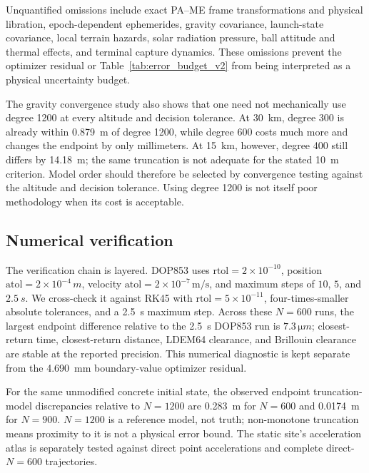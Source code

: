 Unquantified omissions include exact PA--ME frame transformations and physical libration, epoch-dependent ephemerides, gravity covariance, launch-state covariance, local terrain hazards, solar radiation pressure, ball attitude and thermal effects, and terminal capture dynamics. These omissions prevent the optimizer residual or Table~\ref{tab:error_budget_v2} from being interpreted as a physical uncertainty budget.

The gravity convergence study also shows that one need not mechanically use
degree 1200 at every altitude and decision tolerance. At \SI{30}{km}, degree 300 is already within
\SI{0.879}{m} of degree 1200, while degree 600 costs much more and changes the
endpoint by only millimeters. At \SI{15}{km}, however, degree 400 still differs
by \SI{14.18}{m}; the same truncation is not adequate for the stated
\SI{10}{m} criterion. Model order should therefore be selected by convergence
testing against the altitude and decision tolerance. Using degree 1200 is not
itself poor methodology when its cost is acceptable.

\subsection{Numerical verification}

The verification chain is layered. DOP853 uses
\(\mathrm{rtol}=2\times10^{-10}\), position
\(\mathrm{atol}=2\times10^{-4}\,\si{m}\), velocity
\(\mathrm{atol}=2\times10^{-7}\,\si{\metre\per\second}\), and maximum steps of
\(10\), \(5\), and \(\SI{2.5}{s}\). We cross-check it against RK45 with
\(\mathrm{rtol}=5\times10^{-11}\), four-times-smaller absolute tolerances,
and a \SI{2.5}{s} maximum step. Across these \(N=600\) runs, the largest
endpoint difference relative to the \SI{2.5}{s} DOP853 run is
\(7.3\,\si{\micro m}\); closest-return time, closest-return distance,
LDEM64 clearance, and Brillouin clearance are stable at the reported
precision. This numerical diagnostic is kept separate from the
\SI{4.690}{mm} boundary-value optimizer residual.

For the same unmodified concrete initial state, the observed endpoint
truncation-model discrepancies relative to \(N=1200\) are \SI{0.283}{m} for
\(N=600\) and \SI{0.0174}{m} for \(N=900\). \(N=1200\) is a reference
model, not truth; non-monotone truncation means proximity to it is not a
physical error bound. The static site's acceleration atlas is separately
tested against direct point accelerations and complete direct-\(N=600\)
trajectories.

